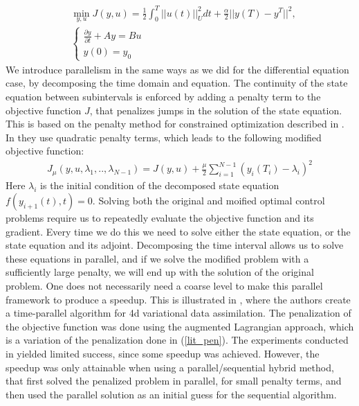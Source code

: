 \begin{align*}
&\min_{y,u}J(y,u) = \frac{1}{2}\int_0^T||u(t)||_U^2dt + \frac{\alpha}{2}||y(T)-y^T||^2,\\
&\left\{
     \begin{array}{lr}
       	\frac{\partial y}{\partial t}+Ay = Bu\\
       	   y(0)=y_0
     \end{array}
   \right.
\end{align*}
We introduce parallelism in the same ways as we did for the differential equation case, by decomposing the time domain and equation. The continuity of the state equation between subintervals is enforced by adding a penalty term to the objective function $J$, that penalizes jumps in the solution of the state equation. This is based on the penalty method for constrained optimization described in \cite{nocedal2006numerical}. In \cite{maday2002parareal} they use quadratic penalty terms, which leads to the following modified objective function:
\begin{align}
J_{\mu}(y,u,\lambda_1,..,\lambda_{N-1})=J(y,u) +\frac{\mu }{2}\sum_{i=1}^{N-1}(y_i(T_i)-\lambda_i)^2 \label{lit_pen}
\end{align} 
Here $\lambda_i$ is the initial condition of the decomposed state equation $f(y_{i+1}(t),t)=0$. Solving both the original and moified optimal control problems require us to repeatedly evaluate the objective function and its gradient. Every time we do this we need to solve either the state equation, or the state equation and its adjoint. Decomposing the time interval allows us to solve these equations in parallel, and if we solve the modified problem with a sufficiently large penalty, we will end up with the solution of the original problem. One does not necessarily need a coarse level to make this parallel framework to produce a speedup. This is illustrated in \cite{rao2016time}, where the authors create a time-parallel algorithm for 4d variational data assimilation. The penalization of the objective function was done using the augmented Lagrangian approach, which is a variation of the penalization done in (\ref{lit_pen}). The experiments conducted in \cite{rao2016time} yielded limited success, since some speedup was achieved. However, the speedup was only attainable when using a parallel/sequential hybrid method, that first solved the penalized problem in parallel, for small penalty terms, and then used the parallel solution as an initial guess for the sequential algorithm. 
\\
\\

